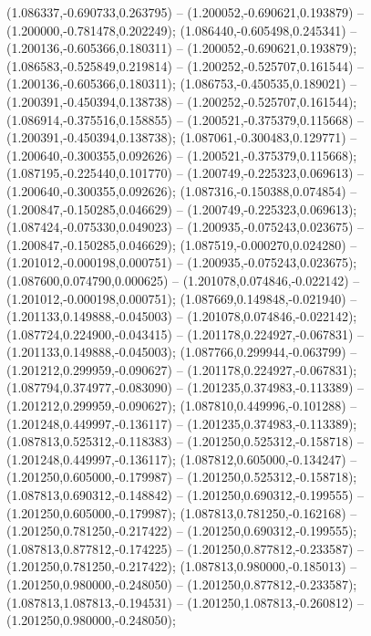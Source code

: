  (1.086337,-0.690733,0.263795) -- (1.200052,-0.690621,0.193879) -- (1.200000,-0.781478,0.202249);
 (1.086440,-0.605498,0.245341) -- (1.200136,-0.605366,0.180311) -- (1.200052,-0.690621,0.193879);
 (1.086583,-0.525849,0.219814) -- (1.200252,-0.525707,0.161544) -- (1.200136,-0.605366,0.180311);
 (1.086753,-0.450535,0.189021) -- (1.200391,-0.450394,0.138738) -- (1.200252,-0.525707,0.161544);
 (1.086914,-0.375516,0.158855) -- (1.200521,-0.375379,0.115668) -- (1.200391,-0.450394,0.138738);
 (1.087061,-0.300483,0.129771) -- (1.200640,-0.300355,0.092626) -- (1.200521,-0.375379,0.115668);
 (1.087195,-0.225440,0.101770) -- (1.200749,-0.225323,0.069613) -- (1.200640,-0.300355,0.092626);
 (1.087316,-0.150388,0.074854) -- (1.200847,-0.150285,0.046629) -- (1.200749,-0.225323,0.069613);
 (1.087424,-0.075330,0.049023) -- (1.200935,-0.075243,0.023675) -- (1.200847,-0.150285,0.046629);
 (1.087519,-0.000270,0.024280) -- (1.201012,-0.000198,0.000751) -- (1.200935,-0.075243,0.023675);
 (1.087600,0.074790,0.000625) -- (1.201078,0.074846,-0.022142) -- (1.201012,-0.000198,0.000751);
 (1.087669,0.149848,-0.021940) -- (1.201133,0.149888,-0.045003) -- (1.201078,0.074846,-0.022142);
 (1.087724,0.224900,-0.043415) -- (1.201178,0.224927,-0.067831) -- (1.201133,0.149888,-0.045003);
 (1.087766,0.299944,-0.063799) -- (1.201212,0.299959,-0.090627) -- (1.201178,0.224927,-0.067831);
 (1.087794,0.374977,-0.083090) -- (1.201235,0.374983,-0.113389) -- (1.201212,0.299959,-0.090627);
 (1.087810,0.449996,-0.101288) -- (1.201248,0.449997,-0.136117) -- (1.201235,0.374983,-0.113389);
 (1.087813,0.525312,-0.118383) -- (1.201250,0.525312,-0.158718) -- (1.201248,0.449997,-0.136117);
 (1.087812,0.605000,-0.134247) -- (1.201250,0.605000,-0.179987) -- (1.201250,0.525312,-0.158718);
 (1.087813,0.690312,-0.148842) -- (1.201250,0.690312,-0.199555) -- (1.201250,0.605000,-0.179987);
 (1.087813,0.781250,-0.162168) -- (1.201250,0.781250,-0.217422) -- (1.201250,0.690312,-0.199555);
 (1.087813,0.877812,-0.174225) -- (1.201250,0.877812,-0.233587) -- (1.201250,0.781250,-0.217422);
 (1.087813,0.980000,-0.185013) -- (1.201250,0.980000,-0.248050) -- (1.201250,0.877812,-0.233587);
 (1.087813,1.087813,-0.194531) -- (1.201250,1.087813,-0.260812) -- (1.201250,0.980000,-0.248050);
